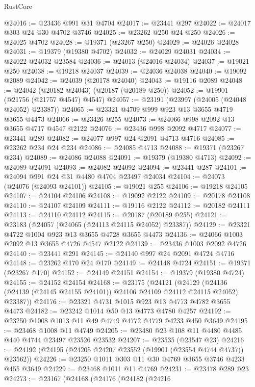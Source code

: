 \begin{lexlean}{RustCore}
\begin{coremodule}
@24016 := @23436 @991 @31 @4704
@24017 := @23441 @297
@24022 := @24017 @303 @24 @30 @4702 @3746
@24025 := @23262 @250 @24 @250
@24026 := @24025 @4702
@24028 := @19371 (@23267 @250)
@24029 := @24026 @24028
@24031 := @19379 (@19380 @4702)
@24032 := @24029 @24031
@24034 := @24022 @24032 @23584
@24036 := @24013 (@24016 @24034)
@24037 := @19021 @250
@24038 := @19218 @24037
@24039 := @24036 @24038
@24040 := @19092 @2089
@24042 := @24039 (@20178 @24040)
@24043 := @19116 @2089
@24048 := @24042 (@20182 @24043) (@20187 (@20189 @250))
@24052 := @19901 (@21756 (@21757 @4547) @4547)
@24057 := @23191 (@23997 (@24005 (@24048 @24052) @23387))
@24065 := @23321 @4709 @999 @923 @13 @3655 @4719 @3655 @4473
@24066 := @23426 @255
@24073 := @24066 @998 @2092 @13 @3655 @4717 @4547 @2122
@24076 := @23436 @998 @2092 @4717
@24077 := @23441 @289
@24082 := @24077 @997 @24 @2091 @4713 @4716
@24085 := @23262 @234 @24 @234
@24086 := @24085 @4713
@24088 := @19371 (@23267 @234)
@24089 := @24086 @24088
@24091 := @19379 (@19380 @4713)
@24092 := @24089 @24091
@24093 := @24082 @24092
@24094 := @23441 @287
@24101 := @24094 @991 @24 @31 @4480 @4704 @23497 @24034
@24104 := @24073 (@24076 (@24093 @24101))
@24105 := @19021 @255
@24106 := @19218 @24105
@24107 := @24104 @24106
@24108 := @19092 @2122
@24109 := @20178 @24108
@24110 := @24107 @24109
@24111 := @19116 @2122
@24112 := @20182 @24111
@24113 := @24110 @24112
@24115 := @20187 (@20189 @255)
@24121 := @23183 (@24057 (@24065 (@24113 @24115 @24052) @23387))
@24129 := @23321 @4722 @1004 @923 @13 @3655 @4728 @3655 @4473
@24136 := @24066 @1003 @2092 @13 @3655 @4726 @4547 @2122
@24139 := @23436 @1003 @2092 @4726
@24140 := @23441 @291
@24145 := @24140 @997 @24 @2091 @4724 @4716
@24148 := @23262 @170 @24 @170
@24149 := @24148 @4724
@24151 := @19371 (@23267 @170)
@24152 := @24149 @24151
@24154 := @19379 (@19380 @4724)
@24155 := @24152 @24154
@24168 := @23175
    (@24121
      (@24129 (@24136 (@24139 (@24145 @24155 @24101)) @24106 @24109 @24112 @24115 @24052) @23387))
@24176 := @23321 @4731 @1015 @923 @13 @4773 @4782 @3655 @4473
@24182 := @23242 @1014 @50 @13 @4773 @4780 @4257
@24192 := @23250 @1008 @1013 @11 @49 @4749 @4772 @4779 @4233 @450 @3649
@24195 := @23468 @1008 @11 @4749
@24205 := @23480 @23 @108 @11 @4480 @4485 @440 @4744 @23497 @23526 @23532
@24207 := @23535 (@23547 @23)
@24216 := @24192 (@24195 (@24205 @24207 @23552 (@19901 (@23554 @4744 @4737)) @23562))
@24226 := @23250 @1011 @303 @11 @30 @4769 @3655 @3746 @4233 @455 @3649
@24229 := @23468 @1011 @11 @4769
@24231 := @23478 @289 @23
@24273 := @23167
    (@24168
      (@24176
        (@24182
          (@24216

\end{coremodule}
\end{lexlean}
